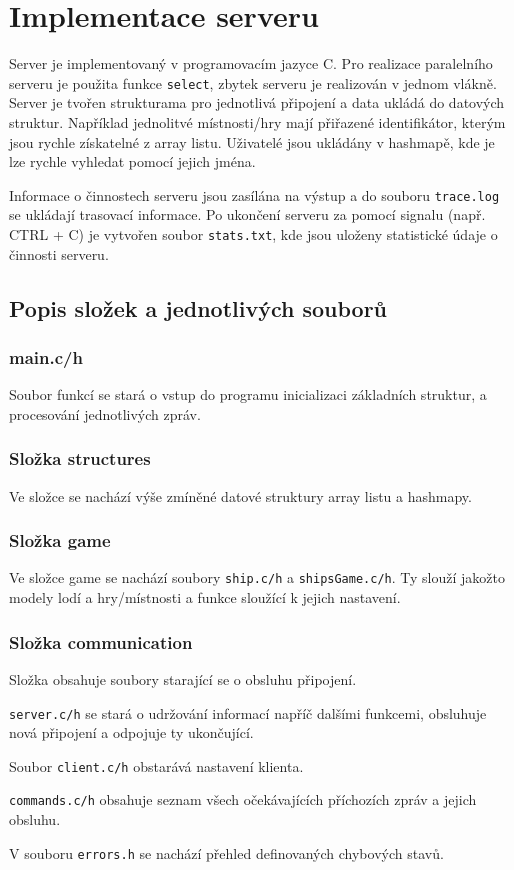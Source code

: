 \documentclass[12pt, a4paper]{article} %
\begin{document}
	\section{Implementace serveru}
	\par Server je implementovaný v programovacím jazyce C. Pro realizace paralelního serveru je použita funkce \texttt{select}, zbytek serveru je realizován v jednom vlákně. Server je tvořen strukturama pro jednotlivá připojení a data ukládá do datových struktur. Například jednolitvé místnosti/hry mají přiřazené identifikátor, kterým jsou rychle získatelné z array listu. Uživatelé jsou ukládány v hashmapě, kde je lze rychle vyhledat pomocí jejich jména.
	
	\par Informace o činnostech serveru jsou zasílána na výstup a do souboru \texttt{trace.log} se ukládají trasovací informace. Po ukončení serveru za pomocí signalu (např. CTRL + C) je vytvořen soubor \texttt{stats.txt}, kde jsou uloženy statistické údaje o činnosti serveru.

	\subsection{Popis složek a jednotlivých souborů}
	\subsubsection{main.c/h}
	\par Soubor funkcí se stará o vstup do programu inicializaci základních struktur, a procesování jednotlivých zpráv.
	\subsubsection{Složka structures}
	\par Ve složce se nachází výše zmíněné datové struktury array listu a hashmapy.
	\subsubsection{Složka game}
	\par Ve složce game se nachází soubory \texttt{ship.c/h} a \texttt{shipsGame.c/h}. Ty slouží jakožto modely lodí a hry/místnosti a funkce sloužící k jejich nastavení.
	\subsubsection{Složka communication}
	\par Složka obsahuje soubory starající se o obsluhu připojení.\\
	\par \texttt{server.c/h} se stará o udržování informací napříč dalšími funkcemi,  obsluhuje nová připojení a odpojuje ty ukončující.
	\par Soubor \texttt{client.c/h} obstarává nastavení klienta.
	\par \texttt{commands.c/h} obsahuje seznam všech očekávajících příchozích zpráv a jejich obsluhu.
	\par V souboru \texttt{errors.h} se nachází přehled definovaných chybových stavů.	
	
\end{document}
